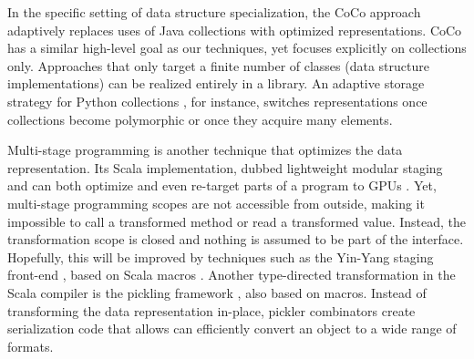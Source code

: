 In the specific setting of data structure specialization, the CoCo
approach~\cite{Xu:2013:CSA:2524984.2524986} adaptively replaces uses
of Java collections with optimized representations.  CoCo has a
similar high-level goal as our techniques, yet focuses explicitly on
collections only.  Approaches that only target a finite number of
classes (data structure implementations) can be realized entirely in a
library. An adaptive storage strategy for Python collections
\cite{Bolz:2013:SSC:2509136.2509531}, for instance, switches
representations once collections become polymorphic or once they
acquire many elements.

Multi-stage programming \cite{taha-intro} is another technique that
optimizes the data representation. Its Scala implementation, dubbed
lightweight modular staging and can both optimize and even re-target parts of a
program to GPUs \cite{tiark-lms,delite}. Yet, multi-stage programming
scopes are not accessible from outside, making it impossible to call
a transformed method or read a transformed value. Instead, the transformation
scope is closed and nothing is assumed to be part of the interface.
Hopefully, this will be improved by techniques such as the Yin-Yang
staging front-end \cite{vojin-yy}, based on Scala macros \cite{eugene-macros}.
Another type-directed transformation in the Scala compiler is the
pickling framework \cite{heather-pickers}, also based on macros.
Instead of transforming the data representation in-place, pickler combinators
create serialization code that allows can efficiently convert an object to a wide
range of formats.